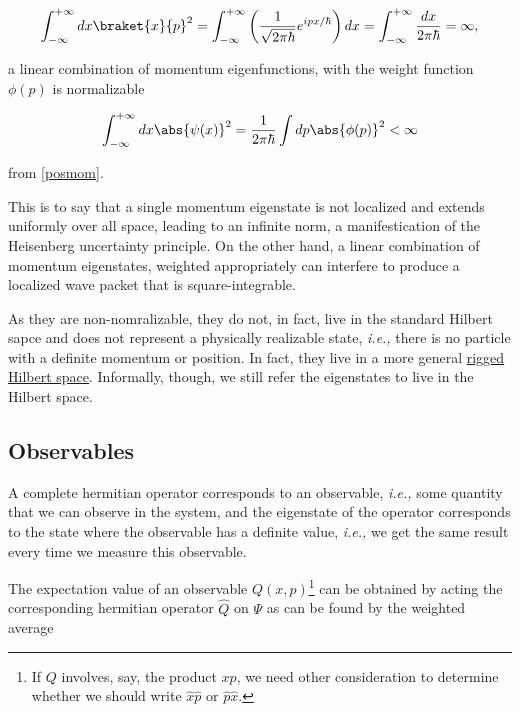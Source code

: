 \documentclass[a4paper,12pt]{report}
\begin{document}
\begin{equation}
  \int_{-\infty}^{+\infty} dx \braket{x}{p} ^2  = \int_{-\infty}^{+\infty} \left( \frac{1}{\sqrt{2\pi \hbar } } e^{ipx /\hbar }   \right) dx = \int_{-\infty}^{+\infty} \frac{dx}{2\pi \hbar } = \infty,  
\end{equation}

a linear combination of momentum eigenfunctions, with the weight function \(\phi (p)\) is normalizable 

\begin{equation}
  \int_{-\infty}^{+\infty} dx \abs{\psi (x)}^2 = \frac{1}{2\pi \hbar } \int dp \abs{\phi (p)}^2 < \infty  
\end{equation}

from \cref{posmom}. 

This is to say that a single momentum eigenstate is not localized and extends uniformly over all space, leading to an infinite norm, a manifestication of the Heisenberg uncertainty principle. On the other hand, a linear combination of momentum eigenstates, weighted appropriately can interfere to produce a localized wave packet that is square-integrable.

As they are non-nomralizable, they do not, in fact, live in the standard Hilbert sapce and does not represent a physically realizable state, \textit{i.e.,} there is no particle with a definite momentum or position. In fact, they live in a more general \href{https:////en.wikipedia.org//wiki//Rigged_Hilbert_space}{rigged Hilbert space}. Informally, though, we still refer the eigenstates to live in the Hilbert space. 

\subsection{Observables}
A complete hermitian operator corresponds to an observable, \textit{i.e.,} some quantity that we can observe in the system, and the eigenstate of the operator corresponds to the state where the observable has a definite value, \textit{i.e.,} we get the same result every time we measure this observable. 

The expectation value of an observable \(Q(x,p)\)\footnote{If \(Q\) involves, say, the product \(xp\), we need other consideration to determine whether we should write \(\hat{x} \hat{p} \text { or } \hat{p} \hat{x}  \).} can be obtained by acting the corresponding hermitian operator \(\hat{Q} \) on \(\Psi \) as can be found by the weighted average
\end{document}
